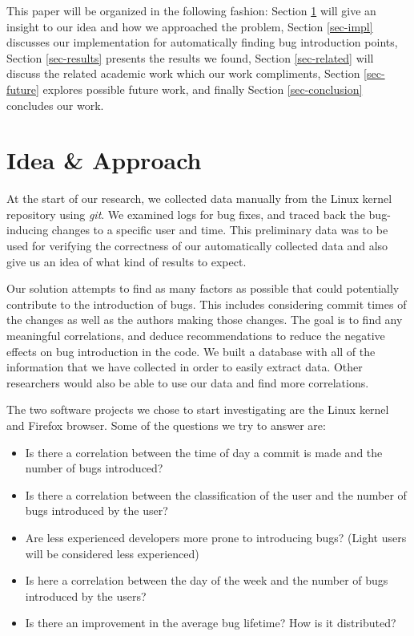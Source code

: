 \documentclass[preprint, 11pt]{sigplanconf}
\begin{document}
This paper will be organized in the following fashion: Section
\ref{sec-idea} will give an insight to our idea and how we approached
the problem, Section \ref{sec-impl} discusses our implementation for
automatically finding bug introduction points, Section
\ref{sec-results} presents the results we found, Section
\ref{sec-related} will discuss the related academic work which our
work compliments, Section \ref{sec-future} explores possible future
work, and finally Section \ref{sec-conclusion} concludes our work.

\section{Idea \& Approach}
\label{sec-idea}

At the start of our research, we collected data manually from the
Linux kernel repository using {\em git}. We examined logs for bug
fixes, and traced back the bug-inducing changes to a specific user and
time. This preliminary data was to be used for verifying the
correctness of our automatically collected data and also give
us an idea of what kind of results to expect.

Our solution attempts to find as many factors as possible that could
potentially contribute to the introduction of bugs. This includes
considering commit times of the changes as well as the authors making
those changes. The goal is to find any meaningful correlations, and deduce
recommendations to reduce the negative effects on bug introduction in
the code. We built a database with all of the information that we have
collected in order to easily extract data. Other researchers would also
be able to use our data and find more correlations.

The two software projects we chose to start investigating are the Linux kernel and
Firefox browser. Some of the questions we try to answer are:
\begin{itemize}
\item
Is there a correlation between the time of day a commit is made and the number 
of bugs introduced?
\item
Is there a correlation between the classification of the user and the number 
of bugs introduced by the user?
\item
Are less experienced developers more prone to introducing bugs? (Light users will
be considered less experienced)
\item
Is here a correlation between the day of the week and the number of bugs
introduced by the users?
\item
Is there an improvement in the average bug lifetime? How is it distributed?
\end{itemize}
\end{document}
